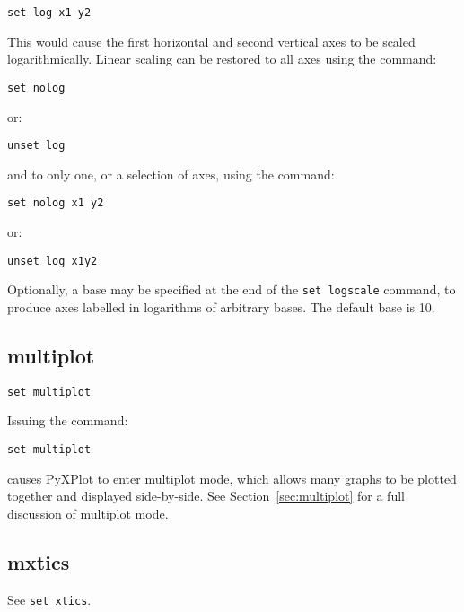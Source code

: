 \begin{verbatim}
set log x1 y2
\end{verbatim}

\noindent This would cause the first horizontal and second vertical axes to be
scaled logarithmically.  Linear scaling can be restored to all axes using the
command:

\begin{verbatim}
set nolog
\end{verbatim}

\noindent or:

\begin{verbatim}
unset log
\end{verbatim}

\noindent and to only one, or a selection of axes, using the command:

\begin{verbatim}
set nolog x1 y2
\end{verbatim}

\noindent or:

\begin{verbatim}
unset log x1y2
\end{verbatim}

Optionally, a base may be specified at the end of the {\tt set logscale}
command, to produce axes labelled in logarithms of arbitrary bases.  The default
base is 10.


\subsection{multiplot}

\begin{verbatim}
set multiplot
\end{verbatim}

Issuing the command:

\begin{verbatim}
set multiplot
\end{verbatim}

\noindent causes PyXPlot to enter multiplot mode, which allows many graphs to
be plotted together and displayed side-by-side. See Section~\ref{sec:multiplot}
for a full discussion of multiplot mode.


\subsection{mxtics}

See {\tt set xtics}.


